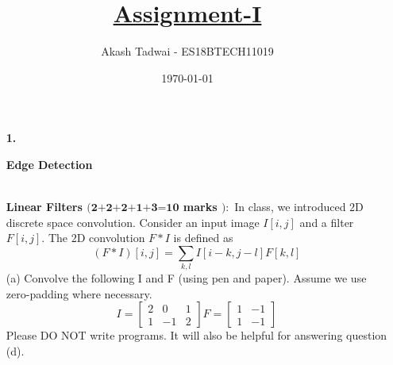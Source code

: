 \documentclass[english,a4paper,12pt]{article}
\title{\textbf{\underline{\Huge{Assignment-I }}}}
\author{Akash Tadwai - ES18BTECH11019
}
\date{\today}
\begin{document}
\maketitle
\begin{enumerate}

\item[\textbf{1.}] {\begin{center}
       \large{\textbf{Edge Detection}}  \\~\\
   \end{center}
\textbf{Linear Filters $(\textbf{2+2+2+1+3=10}$ marks $):$} In class, we introduced $2 \mathrm{D}$ discrete space convolution. Consider an input image $I[i, j]$ and a filter $F[i, j] .$ The $2 \mathrm{D}$ convolution $F * I$ is defined as
$$
(F * I)[i, j]=\sum_{k, l} I[i-k, j-l] F[k, l]
$$
(a) Convolve the following I and F (using pen and paper). Assume we use zero-padding where necessary.
$$
I=\left[\begin{array}{ccc}
2 & 0 & 1 \\
1 & -1 & 2
\end{array}\right] F=\left[\begin{array}{cc}
1 & -1 \\
1 & -1
\end{array}\right]
$$
Please DO NOT write programs. It will also be helpful for answering question (d).

}
\end{enumerate}
\end{document}
